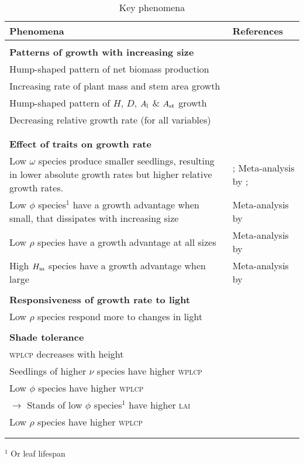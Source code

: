 \documentclass[a4paper,11pt]{article}
\begin{document}
\begin{table}[ht]
\caption{Key phenomena}
{\footnotesize
{\centering
  \begin{tabular}{p{9cm}p{6cm}}
  \\
  \hline
  Phenomena & References \\
  \hline

  \\ \multicolumn{2}{l}{\bf{Patterns of growth with increasing size}}\\
  Hump-shaped pattern of net biomass production & \citet{Givnish-1988, Koch-2004} \\
  Increasing rate of plant mass and stem area growth & \citet{Sillett-2010, Stephenson-2014} \\
  Hump-shaped pattern of $H$, $D$, $A_{\rm l}$ \& $A_{\rm st}$ growth& \citet{King-2005, Ryan-2006, Sillett-2010, Herault-2011, King-2011} \\
  Decreasing relative growth rate (for all variables) & \citet{Rees-2010, Iida-2014}\\
  \\
  \\ \multicolumn{2}{l}{\bf{Effect of traits on growth rate}}\\
  Low $\omega$ species produce smaller seedlings, resulting in lower absolute growth rates but higher relative growth rates. & \citet{Turnbull-2012};  Meta-analysis by \citet{Gibert-2016};\\
  Low $\phi$ species$^1$ have a growth advantage when small, that dissipates with increasing size & Meta-analysis by \citet{Gibert-2016}\\
  Low $\rho$ species have a growth advantage at all sizes & Meta-analysis by \citet{Gibert-2016}\\
  High $H_{\rm m}$ species have a growth advantage when large & Meta-analysis by \citet{Gibert-2016}\\

  \\ \multicolumn{2}{l}{\bf{Responsiveness of growth rate to light}}\\
  Low $\rho$ species respond more to changes in light & \citep{Ruger-2012}\\

  \\ \multicolumn{2}{l}{\bf{Shade tolerance}}\\
  \textsc{wplcp} decreases with height & \citet{Givnish-1988}\\
  Seedlings of higher $\nu$ species have higher \textsc{wplcp} &  \citet{Baltzer-2007}\\
  Low $\phi$ species have higher \textsc{wplcp} & \citet{Poorter-2006, Baltzer-2007, Lusk-2008}\\
  \quad $\rightarrow$ Stands of low $\phi$ species$^1$  have higher \textsc{lai} &  \citet{Reich-1992, Gower-1993, Niinemets-2010} \\
  Low $\rho$ species have higher \textsc{wplcp} &  \citet{Osunkoya-1996}\\
  \\ \hline
  \\
  \end{tabular}
  }
$^1$ Or leaf lifespan
}
\label{tab:phenomena}
\end{table}
\end{document}
